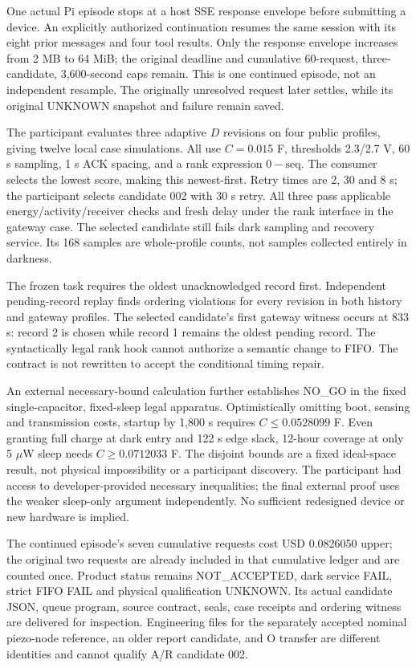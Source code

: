 One actual Pi episode stops at a host SSE response envelope before submitting
a device. An explicitly authorized continuation resumes the same session with
its eight prior messages and four tool results. Only the response envelope
increases from 2 MB to 64 MiB; the original deadline and cumulative 60-request,
three-candidate, 3,600-second caps remain. This is one continued episode, not
an independent resample. The originally unresolved request later settles,
while its original UNKNOWN snapshot and failure remain saved.

The participant evaluates three adaptive $D$ revisions on four public profiles,
giving twelve local case simulations. All use $C=0.015$ F, thresholds 2.3/2.7 V,
60 s sampling, 1 s ACK spacing, and a rank expression $0-\mathrm{seq}$.
The consumer selects the lowest score, making this newest-first. Retry times
are 2, 30 and 8 s; the participant selects candidate 002 with 30 s retry.
All three pass applicable energy/activity/receiver checks and fresh delay
under the rank interface in the gateway case. The selected candidate still
fails dark sampling and recovery service. Its 168 samples are whole-profile
counts, not samples collected entirely in darkness.



The frozen task requires the oldest unacknowledged record first. Independent
pending-record replay finds ordering violations for every revision in both
history and gateway profiles. The selected candidate's first gateway witness
occurs at 833 s: record 2 is chosen while record 1 remains the oldest pending
record. The syntactically legal rank hook cannot authorize a semantic change
to FIFO. The contract is not rewritten to accept the conditional timing repair.

An external necessary-bound calculation further establishes NO\_GO in the
fixed single-capacitor, fixed-sleep legal apparatus. Optimistically omitting
boot, sensing and transmission costs, startup by 1,800 s requires
$C\leq0.0528099$ F. Even granting full charge at dark entry and 122 s edge
slack, 12-hour coverage at only 5 $\mu$W sleep needs
$C\geq0.0712033$ F. The disjoint bounds are a fixed ideal-space result, not
physical impossibility or a participant discovery. The participant had access
to developer-provided necessary inequalities; the final external proof uses
the weaker sleep-only argument independently. No sufficient redesigned device
or new hardware is implied.

The continued episode's seven cumulative requests cost USD 0.0826050 upper;
the original two requests are already included in that cumulative ledger and
are counted once. Product status remains NOT\_ACCEPTED, dark service FAIL,
strict FIFO FAIL and physical qualification UNKNOWN. Its actual candidate
JSON, queue program, source contract, seals, case receipts and ordering witness
are delivered for inspection. Engineering files for the separately accepted
nominal piezo-node reference, an older report candidate, and O transfer are
different identities and cannot qualify A/R candidate 002.

